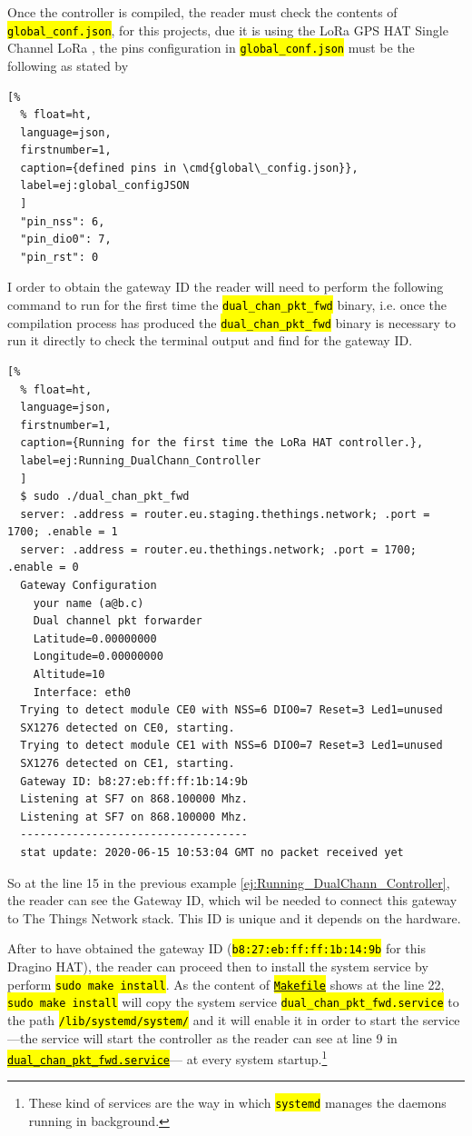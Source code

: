\documentclass[11pt,a4paper,dvipsnames,twoside]{article}
\newcommand{\cmd}[1] {\hl{\texttt{#1}}}
\begin{document}
Once the controller is compiled, the reader must check the contents of \cmd{global\_conf.json}, for this projects, due it is using the LoRa GPS HAT Single Channel LoRa \cite{DraginoRpiHat}, the pins configuration in \cmd{global\_conf.json} must be the following as stated by \cite{Dragino_DualChannelController_Rpi}

\begin{lstlisting}[%
  % float=ht,
  language=json,
  firstnumber=1,
  caption={defined pins in \cmd{global\_config.json}},
  label=ej:global_configJSON
  ]
  "pin_nss": 6,
  "pin_dio0": 7,
  "pin_rst": 0
\end{lstlisting}

I order to obtain the gateway ID the reader will need to perform the following command to run for the first time the \cmd{dual\_chan\_pkt\_fwd} binary, i.e. once the compilation process has produced the \cmd{dual\_chan\_pkt\_fwd} binary is necessary to run it directly to check the terminal output and find for the gateway ID.

\begin{lstlisting}[%
  % float=ht,
  language=json,
  firstnumber=1,
  caption={Running for the first time the LoRa HAT controller.},
  label=ej:Running_DualChann_Controller
  ]
  $ sudo ./dual_chan_pkt_fwd
  server: .address = router.eu.staging.thethings.network; .port = 1700; .enable = 1
  server: .address = router.eu.thethings.network; .port = 1700; .enable = 0
  Gateway Configuration
    your name (a@b.c)
    Dual channel pkt forwarder
    Latitude=0.00000000
    Longitude=0.00000000
    Altitude=10
    Interface: eth0
  Trying to detect module CE0 with NSS=6 DIO0=7 Reset=3 Led1=unused
  SX1276 detected on CE0, starting.
  Trying to detect module CE1 with NSS=6 DIO0=7 Reset=3 Led1=unused
  SX1276 detected on CE1, starting.
  Gateway ID: b8:27:eb:ff:ff:1b:14:9b
  Listening at SF7 on 868.100000 Mhz.
  Listening at SF7 on 868.100000 Mhz.
  -----------------------------------
  stat update: 2020-06-15 10:53:04 GMT no packet received yet 
\end{lstlisting}

So at the line 15 in the previous example \ref{ej:Running_DualChann_Controller}, the reader can see the Gateway ID, which wil be needed to connect this gateway to The Things Network stack. This ID is unique and it depends on the hardware.

After to have obtained the gateway ID (\cmd{b8:27:eb:ff:ff:1b:14:9b} for this Dragino HAT), the reader can proceed then to install the system service by perform \cmd{sudo make install}. As the content of \href{https://github.com/dragino/dual_chan_pkt_fwd/blob/master/Makefile#L22}{\cmd{Makefile}} shows at the line 22, \cmd{sudo make install} will copy the system service \cmd{dual\_chan\_pkt\_fwd.service} to the path \cmd{/lib/systemd/system/} and it will enable it in order to start the service ---the service will start the controller as the reader can see at line 9 in \href{https://github.com/dragino/dual_chan_pkt_fwd/blob/master/dual_chan_pkt_fwd.service#L9}{\cmd{dual\_chan\_pkt\_fwd.service}}--- at every system startup.\footnote{These kind of services are the way in which \cmd{systemd} manages the daemons running in background.} 
\end{document}
